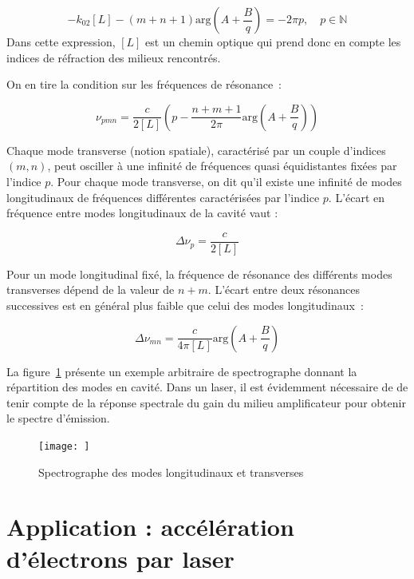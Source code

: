 \documentclass[a4paper]{book}
\begin{document}
\begin{equation}
    -k_02[L]-(m+n+1)\mathrm{arg}\left(A+\frac{B}{q}\right)=-2\pi p, \quad p\in \mathbb{N}
\end{equation}
Dans cette expression, $[L]$ est un chemin optique qui prend donc en compte les indices de réfraction des milieux rencontrés.

On en tire la condition sur les fréquences de résonance~:

\begin{equation}
    \nu_{pmn}=\frac{c}{2[L]}\left(p-\frac{n+m+1}{2\pi}\mathrm{arg}\left(A+\frac{B}{q}\right)\right)
\end{equation}

Chaque mode transverse (notion spatiale), caractérisé par un couple d'indices $(m,n)$, peut osciller à une infinité de fréquences quasi équidistantes fixées par l'indice $p$. Pour chaque mode transverse, on dit qu'il existe une infinité de modes longitudinaux de fréquences différentes caractérisées par l'indice $p$. L'écart en fréquence entre modes longitudinaux de la cavité vaut :

\begin{equation}
    \Delta\nu_p=\frac{c}{2[L]}
\end{equation}

Pour un mode longitudinal fixé, la fréquence de résonance des différents modes transverses dépend de la valeur de $n+m$. L'écart entre deux résonances successives est en général plus faible que celui des modes longitudinaux~:

\begin{equation}
    \Delta\nu_{mn}=\frac{c}{4\pi[L]}\mathrm{arg}\left(A+\frac{B}{q}\right)
\end{equation}

La figure~\ref{fig:modes_long_et_trans} présente un exemple arbitraire de spectrographe donnant la répartition des modes en cavité. Dans un laser, il est évidemment nécessaire de de tenir compte de la réponse spectrale du gain du milieu amplificateur pour obtenir le spectre d'émission.

\begin{figure}[!htbp]
\begin{center}
\texttt{[image: ]}
\end{center}
\caption{Spectrographe des modes longitudinaux et transverses}
\label{fig:modes_long_et_trans}
\end{figure}

\chapter{Application : accélération d'électrons par laser}
\end{document}
